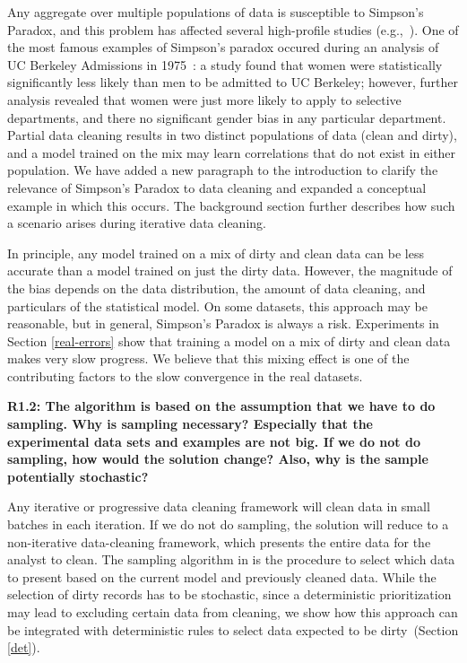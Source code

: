 \noindent Any aggregate over multiple populations of data is susceptible to Simpson's Paradox, and this problem has affected several high-profile studies (e.g.,~\cite{bickel1975sex, charig1986comparison}).
One of the most famous examples of Simpson's paradox occured during an analysis of UC Berkeley Admissions in 1975~\cite{bickel1975sex}: a study found that women were statistically significantly less likely than men to be admitted to UC Berkeley; however, further analysis revealed that women were just more likely to apply to selective departments, and there no significant gender bias in any particular department. 
Partial data cleaning results in two distinct populations of data (clean and dirty), and a model trained on the mix may learn correlations that do not exist in either population. 
We have added a new paragraph to the introduction to clarify the relevance of Simpson's Paradox to data cleaning and expanded a conceptual example in which this occurs.
The background section further describes how such a scenario arises during iterative data cleaning.

In principle, any model trained on a mix of dirty and clean data can be less accurate than a model trained on just the dirty data.
However, the magnitude of the bias depends on the data distribution, the amount of data cleaning, and particulars of the statistical model.
On some datasets, this approach may be reasonable, but in general, Simpson's Paradox is always a risk.
Experiments in Section \ref{real-errors} show that training a model on a mix of dirty and clean data makes very slow progress. 
We believe that this mixing effect is one of the contributing factors to the slow convergence in the real datasets.

\vspace{0.5em}

\noindent\textbf{R1.2: The algorithm is based on the assumption that we have to do sampling. Why is sampling necessary? Especially that the experimental data sets and examples are not big. If we do not do sampling, how would the solution change? Also, why is the sample potentially stochastic?}

\noindent Any iterative or progressive data cleaning framework will clean data in small batches in each iteration. 
If we do not do sampling, the solution will reduce to a non-iterative data-cleaning framework, which presents the entire data for the analyst to clean.
The sampling algorithm in \sys is the procedure to select which data to present based on the current model and previously cleaned data.
While the selection of dirty records has to be stochastic, since a deterministic prioritization may lead to excluding certain data from cleaning, we show how this approach can be integrated with deterministic rules to select data expected to be dirty~(Section \ref{det}).

